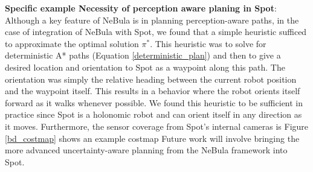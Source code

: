 \documentclass[a4paper, 10pt, conference]{ieeeconf}      %
\newcommand{\ph}[1]{{\textbf{#1}:}} %
\begin{document}
\ph{Specific example Necessity of perception aware planing in Spot}
Although a key feature of NeBula is in planning perception-aware paths, in the case of integration of NeBula with Spot, we found that a simple heuristic sufficed to approximate the optimal solution $\pi^*$.  This heuristic was to solve for deterministic A* paths (Equation \ref{deterministic_plan}) and then to give a desired location and orientation to Spot as a waypoint along this path.  The orientation was simply the relative heading between the current robot position and the waypoint itself.  This results in a behavior where the robot orients itself forward as it walks whenever possible.  We found this heuristic to be sufficient in practice since Spot is a holonomic robot and can orient itself in any direction as it moves.  Furthermore, the sensor coverage from Spot's internal cameras is Figure \ref{bd_costmap} shows an example costmap Future work will involve bringing the more advanced uncertainty-aware planning from the NeBula framework into Spot. 
\end{document}
